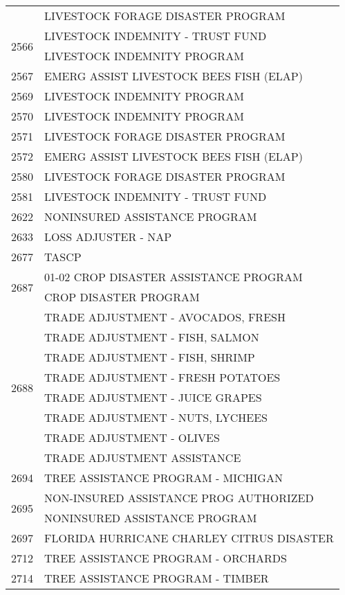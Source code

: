 \begin{longtable}{ll}
 & LIVESTOCK FORAGE DISASTER PROGRAM \\
\cline{1-2}
\multirow[t]{2}{*}{2566} & LIVESTOCK INDEMNITY - TRUST FUND \\
 & LIVESTOCK INDEMNITY PROGRAM \\
\cline{1-2}
2567 & EMERG ASSIST LIVESTOCK BEES FISH (ELAP) \\
\cline{1-2}
2569 & LIVESTOCK INDEMNITY PROGRAM \\
\cline{1-2}
2570 & LIVESTOCK INDEMNITY PROGRAM \\
\cline{1-2}
2571 & LIVESTOCK FORAGE DISASTER PROGRAM \\
\cline{1-2}
2572 & EMERG ASSIST LIVESTOCK BEES FISH (ELAP) \\
\cline{1-2}
2580 & LIVESTOCK FORAGE DISASTER PROGRAM \\
\cline{1-2}
2581 & LIVESTOCK INDEMNITY - TRUST FUND \\
\cline{1-2}
2622 & NONINSURED ASSISTANCE PROGRAM \\
\cline{1-2}
2633 & LOSS ADJUSTER - NAP \\
\cline{1-2}
2677 & TASCP \\
\cline{1-2}
\multirow[t]{2}{*}{2687} & 01-02 CROP DISASTER ASSISTANCE PROGRAM \\
 & CROP DISASTER PROGRAM \\
\cline{1-2}
\multirow[t]{8}{*}{2688} & TRADE ADJUSTMENT - AVOCADOS, FRESH \\
 & TRADE ADJUSTMENT - FISH, SALMON \\
 & TRADE ADJUSTMENT - FISH, SHRIMP \\
 & TRADE ADJUSTMENT - FRESH POTATOES \\
 & TRADE ADJUSTMENT - JUICE GRAPES \\
 & TRADE ADJUSTMENT - NUTS, LYCHEES \\
 & TRADE ADJUSTMENT - OLIVES \\
 & TRADE ADJUSTMENT ASSISTANCE \\
\cline{1-2}
2694 & TREE ASSISTANCE PROGRAM - MICHIGAN \\
\cline{1-2}
\multirow[t]{2}{*}{2695} & NON-INSURED ASSISTANCE PROG AUTHORIZED \\
 & NONINSURED ASSISTANCE PROGRAM \\
\cline{1-2}
2697 & FLORIDA HURRICANE CHARLEY CITRUS DISASTER \\
\cline{1-2}
2712 & TREE ASSISTANCE PROGRAM - ORCHARDS \\
\cline{1-2}
2714 & TREE ASSISTANCE PROGRAM - TIMBER \\

\end{longtable}
